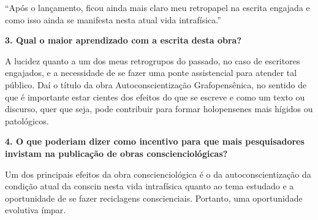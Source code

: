 \documentclass{gescons}
\begin{document}
\begin{multicols}{2}
\begin{pullquote}
``Após o lançamento, ficou ainda mais claro meu retropapel na escrita engajada e como isso ainda se manifesta nesta atual vida intrafísica.''
\end{pullquote}

\textbf{3. Qual o maior aprendizado com a escrita desta obra?}

A lucidez quanto a um dos meus retrogrupos do passado, no caso de
escritores engajados, e a necessidade de se fazer uma ponte assistencial
para atender tal público. Daí o título da obra Autoconscientização
Grafopensênica, no sentido de que é importante estar cientes dos efeitos
do que se escreve e como um texto ou discurso, quer que seja, pode
contribuir para formar holopensenes mais hígidos ou patológicos.

\textbf{4. O que poderiam dizer como incentivo para que mais pesquisadores invistam na publicação de obras conscienciológicas?}

Um dos principais efeitos da obra conscienciológica é o da
autoconscientização da condição atual da conscin nesta vida intrafísica
quanto ao tema estudado e a oportunidade de se fazer reciclagens
conscienciais. Portanto, uma oportunidade evolutiva ímpar.

    
    \end{multicols}
\end{document}
